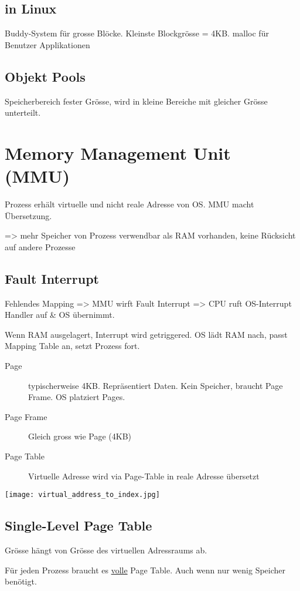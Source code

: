\begin{multicols*}{4}
\subsection{in Linux}
Buddy-System für grosse Blöcke. Kleinste Blockgrösse = 4KB. malloc für Benutzer Applikationen

\subsection{Objekt Pools}
Speicherbereich fester Grösse, wird in kleine Bereiche mit gleicher Grösse unterteilt.

\section{Memory Management Unit (MMU)}
Prozess erhält virtuelle und nicht reale Adresse von OS. MMU macht Übersetzung.

=> mehr Speicher von Prozess verwendbar als RAM vorhanden, keine Rücksicht auf andere Prozesse

\subsection{Fault Interrupt}
Fehlendes Mapping => MMU wirft Fault Interrupt => CPU ruft OS-Interrupt Handler auf \& OS übernimmt.\vspace{2pt}

Wenn RAM ausgelagert, Interrupt wird getriggered. OS lädt RAM nach, passt Mapping Table an, setzt Prozess fort.

\begin{description}
    \item[Page] typischerweise 4KB. Repräsentiert Daten. Kein Speicher, braucht Page Frame. OS platziert Pages.
    \item[Page Frame] Gleich gross wie Page (4KB)
    \item[Page Table] Virtuelle Adresse wird via Page-Table in reale Adresse übersetzt
\end{description}

\texttt{[image: virtual\_address\_to\_index.jpg]}

\subsection{Single-Level Page Table}
Grösse hängt von Grösse des virtuellen Adressraums ab.

Für jeden Prozess braucht es \underline{volle} Page Table. Auch wenn nur wenig Speicher benötigt.


\end{multicols*}
